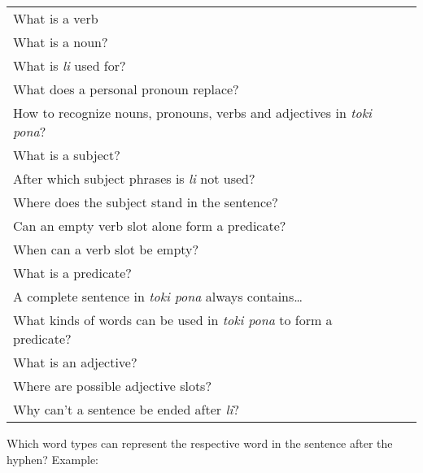 \begin{supertabular}{p{5,5cm}|ll}
    What is a verb                                                                &  & \\ %
    What is a noun?                                                               &  & \\ %
    What is \textit{li} used for?                                                 &  & \\ %
    What does a personal pronoun replace?                                         &  & \\ %
    How to recognize nouns, pronouns, verbs and adjectives in \textit{toki pona}? &  & \\ %
    What is a subject?                                                            &  & \\ %
    After which subject phrases is \textit{li} not used?                          &  & \\ %
    Where does the subject stand in the sentence?                                 &  & \\ %
    Can an empty verb slot alone form a predicate?                                &  & \\ %
    When can a verb slot be empty?                                                &  & \\ %
    What is a predicate?                                                          &  & \\ %
    A complete sentence in \textit{toki pona} always contains\dots                &  & \\ %
    What kinds of words can be used in \textit{toki pona} to form a predicate?    &  & \\ %
    What is an adjective?                                                         &  & \\ %
    Where are possible adjective slots?                                           &  & \\  %
    Why can't a sentence be ended after \textit{li}?                              &  & \\ %
\end{supertabular}

Which word types can represent the respective word in the sentence after the hyphen?
Example:

